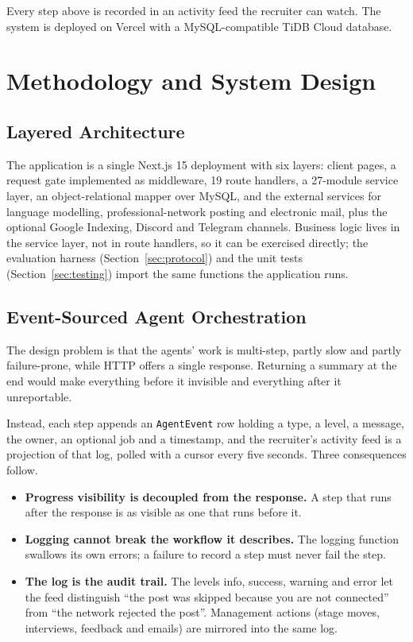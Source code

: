\documentclass[conference]{IEEEtran}
\begin{document}
Every step above is recorded in an activity feed the recruiter can watch. The
system is deployed on Vercel with a MySQL-compatible TiDB Cloud database.

\section{Methodology and System Design}

\subsection{Layered Architecture}

The application is a single Next.js 15 deployment with six layers: client pages,
a request gate implemented as middleware, 19 route handlers, a 27-module service
layer, an object-relational mapper over MySQL, and the external services for
language modelling, professional-network posting and electronic mail, plus the
optional Google Indexing, Discord and Telegram channels. Business logic lives in
the service layer, not in route handlers, so it can be exercised directly; the
evaluation harness (Section~\ref{sec:protocol}) and the unit tests
(Section~\ref{sec:testing}) import the same functions the application runs.

\subsection{Event-Sourced Agent Orchestration}
\label{sec:eventsourcing}

The design problem is that the agents' work is multi-step, partly slow and
partly failure-prone, while HTTP offers a single response. Returning a summary
at the end would make everything before it invisible and everything after it
unreportable.

Instead, each step appends an \texttt{AgentEvent} row holding a type, a level, a
message, the owner, an optional job and a timestamp, and the recruiter's
activity feed is a projection of that log, polled with a cursor every five
seconds. Three consequences follow.

\begin{itemize}
\item \textbf{Progress visibility is decoupled from the response.} A step that
runs after the response is as visible as one that runs before it.
\item \textbf{Logging cannot break the workflow it describes.} The logging
function swallows its own errors; a failure to record a step must never fail
the step.
\item \textbf{The log is the audit trail.} The levels info, success, warning and
error let the feed distinguish ``the post was skipped because you are not
connected'' from ``the network rejected the post''. Management actions (stage
moves, interviews, feedback and emails) are mirrored into the same log.
\end{itemize}
\end{document}
